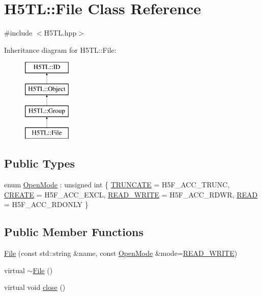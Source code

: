 \hypertarget{class_h5_t_l_1_1_file}{\section{H5\-T\-L\-:\-:File Class Reference}
\label{class_h5_t_l_1_1_file}
}


{\ttfamily \#include $<$H5\-T\-L.\-hpp$>$}

Inheritance diagram for H5\-T\-L\-:\-:File\-:\begin{figure}[H]
\begin{center}
\leavevmode
\includegraphics[height=4.000000cm]{class_h5_t_l_1_1_file}
\end{center}
\end{figure}
\subsection*{Public Types}
\begin{DoxyCompactItemize}
\item 
enum \hyperlink{class_h5_t_l_1_1_file_a19ac74cd8f7db7d836092d9354b51208}{Open\-Mode} \-: unsigned int \{ \hyperlink{class_h5_t_l_1_1_file_a19ac74cd8f7db7d836092d9354b51208a7595a9318f8f007c8177eb6129cc8a55}{T\-R\-U\-N\-C\-A\-T\-E} = H5\-F\-\_\-\-A\-C\-C\-\_\-\-T\-R\-U\-N\-C, 
\hyperlink{class_h5_t_l_1_1_file_a19ac74cd8f7db7d836092d9354b51208afcf13dfdb15f7aa5839846725365a240}{C\-R\-E\-A\-T\-E} = H5\-F\-\_\-\-A\-C\-C\-\_\-\-E\-X\-C\-L, 
\hyperlink{class_h5_t_l_1_1_file_a19ac74cd8f7db7d836092d9354b51208ab0b0c0c75d3e15b086124b605f60d753}{R\-E\-A\-D\-\_\-\-W\-R\-I\-T\-E} = H5\-F\-\_\-\-A\-C\-C\-\_\-\-R\-D\-W\-R, 
\hyperlink{class_h5_t_l_1_1_file_a19ac74cd8f7db7d836092d9354b51208a1827760549531e870388ec6866d0165e}{R\-E\-A\-D} = H5\-F\-\_\-\-A\-C\-C\-\_\-\-R\-D\-O\-N\-L\-Y
 \}
\end{DoxyCompactItemize}
\subsection*{Public Member Functions}
\begin{DoxyCompactItemize}
\item 
\hyperlink{class_h5_t_l_1_1_file_a91c89c5f48ddd0762fd39ee1e0ae73b8}{File} (const std\-::string \&name, const \hyperlink{class_h5_t_l_1_1_file_a19ac74cd8f7db7d836092d9354b51208}{Open\-Mode} \&mode=\hyperlink{class_h5_t_l_1_1_file_a19ac74cd8f7db7d836092d9354b51208ab0b0c0c75d3e15b086124b605f60d753}{R\-E\-A\-D\-\_\-\-W\-R\-I\-T\-E})
\item 
virtual \hyperlink{class_h5_t_l_1_1_file_aa05382409178af69cda0f65a13bd969f}{$\sim$\-File} ()
\item 
virtual void \hyperlink{class_h5_t_l_1_1_file_a5499e761feeab4c85ca3aba1fb218ec9}{close} ()
\end{DoxyCompactItemize}
